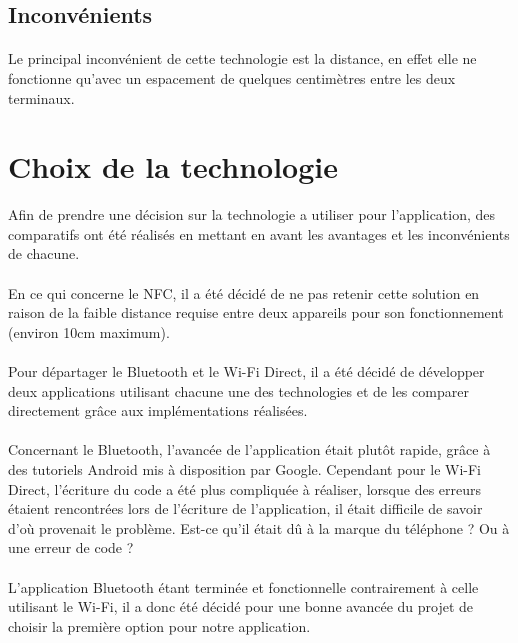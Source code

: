 \documentclass[a4paper,10pt]{report}
\begin{document}
    \subsection{Inconvénients}
    \paragraph{}
    Le principal inconvénient de cette technologie est la distance, en effet elle ne fonctionne qu'avec un espacement de quelques centimètres entre les deux terminaux.
  \section{Choix de la technologie}
  
  Afin de prendre une décision sur la technologie a utiliser pour l'application, des comparatifs ont été réalisés en mettant en avant les avantages et les inconvénients de chacune. 
  \paragraph{}
  En ce qui concerne le NFC, il a été décidé de ne pas retenir cette solution en raison de la faible distance requise entre deux appareils pour son fonctionnement (environ 10cm maximum).
  \paragraph{}
  Pour départager le Bluetooth et le Wi-Fi Direct, il a été décidé de développer deux applications utilisant chacune une des technologies et de les comparer directement grâce aux implémentations réalisées.
  \paragraph{}
  Concernant le Bluetooth, l'avancée de l'application était plutôt rapide, grâce à des tutoriels Android mis à disposition par Google. Cependant pour le Wi-Fi Direct, l'écriture du code a été plus compliquée à réaliser, lorsque des erreurs étaient rencontrées lors de l'écriture de l'application, il était difficile de savoir d'où provenait le problème. Est-ce qu'il était dû à la marque du téléphone ? Ou à une erreur de code ? 
  \paragraph{} 
  L'application Bluetooth étant terminée et fonctionnelle contrairement à celle utilisant le Wi-Fi, il a donc été décidé pour une bonne avancée du projet de choisir la première option pour notre application.
  
\end{document}
